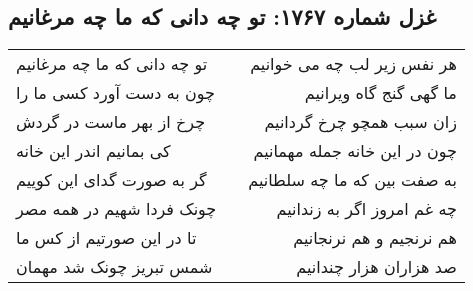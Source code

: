\begin{center}
\section*{غزل شماره ۱۷۶۷: تو چه دانی که ما چه مرغانیم}
\label{sec:1767}
\begin{longtable}{l p{0.5cm} r}
تو چه دانی که ما چه مرغانیم
&&
هر نفس زیر لب چه می خوانیم
\\
چون به دست آورد کسی ما را
&&
ما گهی گنج گاه ویرانیم
\\
چرخ از بهر ماست در گردش
&&
زان سبب همچو چرخ گردانیم
\\
کی بمانیم اندر این خانه
&&
چون در این خانه جمله مهمانیم
\\
گر به صورت گدای این کوییم
&&
به صفت بین که ما چه سلطانیم
\\
چونک فردا شهیم در همه مصر
&&
چه غم امروز اگر به زندانیم
\\
تا در این صورتیم از کس ما
&&
هم نرنجیم و هم نرنجانیم
\\
شمس تبریز چونک شد مهمان
&&
صد هزاران هزار چندانیم
\\
\end{longtable}
\end{center}
